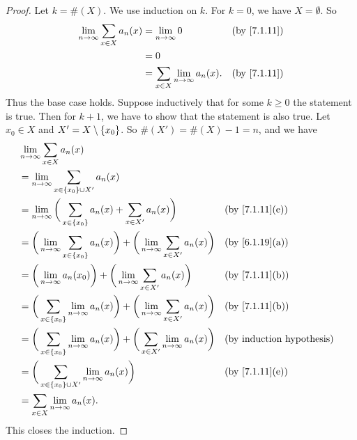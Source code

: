 \begin{proof}
  Let \(k = \#(X)\).
  We use induction on \(k\).
  For \(k = 0\), we have \(X = \emptyset\).
  So
  \begin{align*}
    \lim_{n \to \infty} \sum_{x \in X} a_n(x) & = \lim_{n \to \infty} 0                      &  & \by{7.1.11} \\
                                              & = 0                                                           \\
                                              & = \sum_{x \in X} \lim_{n \to \infty} a_n(x). &  & \by{7.1.11}
  \end{align*}
  Thus the base case holds.
  Suppose inductively that for some \(k \geq 0\) the statement is true.
  Then for \(k + 1\), we have to show that the statement is also true.
  Let \(x_0 \in X\) and \(X' = X \setminus \left\lbrace x_0\right\rbrace\).
  So \(\#(X') = \#(X) - 1 = n\), and we have
  \begin{align*}
     & \lim_{n \to \infty} \sum_{x \in X} a_n(x)                                                                                                                  \\
     & = \lim_{n \to \infty} \sum_{x \in \set{x_0} \cup X'} a_n(x)                                                                                                \\
     & = \lim_{n \to \infty} \bigg(\sum_{x \in \set{x_0}} a_n(x) + \sum_{x \in X'} a_n(x)\bigg)                                 &  & \text{(by \cref{7.1.11}(e))} \\
     & = \bigg(\lim_{n \to \infty} \sum_{x \in \set{x_0}} a_n(x)\bigg) + \bigg(\lim_{n \to \infty} \sum_{x \in X'} a_n(x)\bigg) &  & \text{(by \cref{6.1.19}(a))} \\
     & = \bigg(\lim_{n \to \infty} a_n(x_0)\bigg) + \bigg(\lim_{n \to \infty} \sum_{x \in X'} a_n(x)\bigg)                      &  & \text{(by \cref{7.1.11}(b))} \\
     & = \bigg(\sum_{x \in \set{x_0}} \lim_{n \to \infty} a_n(x)\bigg) + \bigg(\lim_{n \to \infty} \sum_{x \in X'} a_n(x)\bigg) &  & \text{(by \cref{7.1.11}(b))} \\
     & = \bigg(\sum_{x \in \set{x_0}} \lim_{n \to \infty} a_n(x)\bigg) + \bigg(\sum_{x \in X'} \lim_{n \to \infty} a_n(x)\bigg) &  & \byIH                        \\
     & = \bigg(\sum_{x \in \set{x_0} \cup X'} \lim_{n \to \infty} a_n(x)\bigg)                                                  &  & \text{(by \cref{7.1.11}(e))} \\
     & = \sum_{x \in X} \lim_{n \to \infty} a_n(x).
  \end{align*}
  This closes the induction.
\end{proof}
